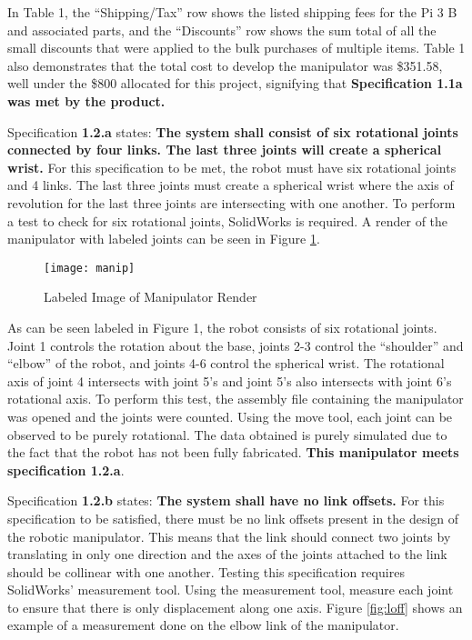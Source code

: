 In Table 1, the “Shipping/Tax” row shows the listed shipping fees for the Pi 3 B and associated parts, and the “Discounts” row shows the sum total of all the small discounts that were applied to the bulk purchases of multiple items. Table 1 also demonstrates that the total cost to develop the manipulator was \$351.58, well under the \$800 allocated for this project, signifying that \textbf{Specification 1.1a was met by the product.}


Specification \textbf{1.2.a} states: \textbf{The system shall consist of six rotational joints connected by four links. The last three joints will create a spherical wrist.} For this specification to be met, the robot must have six rotational joints and 4 links. The last three joints must create a spherical wrist where the axis of revolution for the last three joints are intersecting with one another. To perform a test to check for six rotational joints, SolidWorks is required. A render of the manipulator with labeled joints can be seen in Figure \ref{fig:manip}.


\begin{figure}[htp]
  \centering
  \texttt{[image: manip]}
  \caption{Labeled Image of Manipulator Render}
  \label{fig:manip}
\end{figure}

As can be seen labeled in Figure 1, the robot consists of six rotational joints. Joint 1 controls the rotation about the base,  joints 2-3 control the “shoulder” and “elbow” of the robot, and joints 4-6 control the  spherical wrist. The rotational axis of joint 4 intersects with joint 5’s and joint 5’s also intersects with joint 6’s rotational axis. To perform this test, the assembly file containing the manipulator was opened and the joints were counted. Using the move tool, each joint can be observed to be purely rotational. The data obtained is purely simulated due to the fact that the robot has not been fully fabricated. \textbf{This manipulator meets specification 1.2.a}.


Specification \textbf{1.2.b} states: \textbf{The system shall have no link offsets.} For this specification to be satisfied, there must be no link offsets present in the design of the robotic manipulator. This means that the link should connect two joints by translating in only one direction and the axes of the joints attached to the link should be collinear with one another. Testing this specification requires SolidWorks’ measurement tool. Using the measurement tool, measure each joint to ensure that there is only displacement along one axis. Figure \ref{fig:loff} shows an example of a measurement done on the elbow link of the manipulator.

